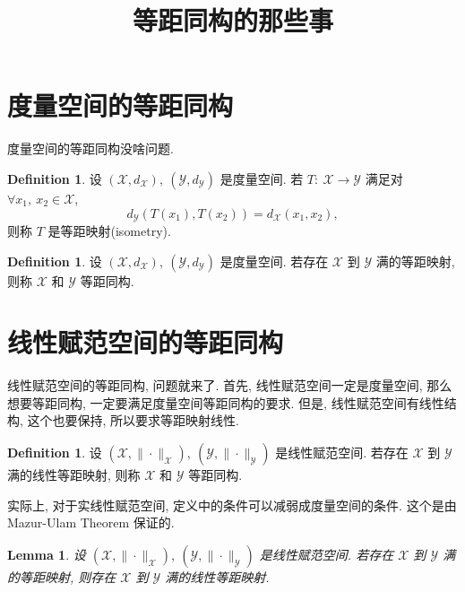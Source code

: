 \documentclass[a4paper,11pt]{article}
\title{等距同构的那些事}
\newtheorem{lemma}[theorem]{Lemma}
\theoremstyle{definition}
\newtheorem{definition}[theorem]{Definition}
\begin{document}
\begin{CJK*}{UTF8}{gbsn}

\maketitle

\section{度量空间的等距同构}

度量空间的等距同构没啥问题.

\begin{definition}
    设 $ (\mathscr{X}, d_{\mathscr{X}}),\ (\mathscr{Y}, d_{\mathscr{Y}}) $ 是度量空间.
    若 $ T :\ \mathscr{X} \to \mathscr{Y} $ 满足对 $ \forall x_1,\ x_2 \in \mathscr{X} $,
    $$
        d_{\mathscr{Y}} (T(x_1), T(x_2)) = d_{\mathscr{X}} (x_1, x_2),
    $$
    则称 $ T $ 是等距映射(isometry).
\end{definition}

\begin{definition}
    设 $ (\mathscr{X}, d_{\mathscr{X}}),\ (\mathscr{Y}, d_{\mathscr{Y}}) $ 是度量空间.
    若存在 $ \mathscr{X} $ 到 $ \mathscr{Y} $ 满的等距映射, 则称 $ \mathscr{X} $ 和 $ \mathscr{Y} $ 等距同构.
\end{definition}

\section{线性赋范空间的等距同构}

线性赋范空间的等距同构, 问题就来了. 首先, 线性赋范空间一定是度量空间, 
那么想要等距同构, 一定要满足度量空间等距同构的要求.
但是, 线性赋范空间有线性结构, 这个也要保持, 所以要求等距映射线性.

\begin{definition}
    设 $ (\mathscr{X}, \| \cdot \|_\mathscr{X}),\ (\mathscr{Y}, \| \cdot \|_\mathscr{Y}) $ 是线性赋范空间.
    若存在 $ \mathscr{X} $ 到 $ \mathscr{Y} $ 满的线性等距映射, 则称 $ \mathscr{X} $ 和 $ \mathscr{Y} $ 等距同构.
\end{definition}

实际上, 对于实线性赋范空间, 定义中的条件可以减弱成度量空间的条件.
这个是由 Mazur-Ulam Theorem 保证的.

\begin{lemma}  \label{1}
    设 $ (\mathscr{X}, \| \cdot \|_\mathscr{X}),\ (\mathscr{Y}, \| \cdot \|_\mathscr{Y}) $ 是线性赋范空间.
    若存在 $ \mathscr{X} $ 到 $ \mathscr{Y} $ 满的等距映射, 则存在 $ \mathscr{X} $ 到 $ \mathscr{Y} $ 满的线性等距映射.
\end{lemma}


\end{CJK*}
\end{document}
